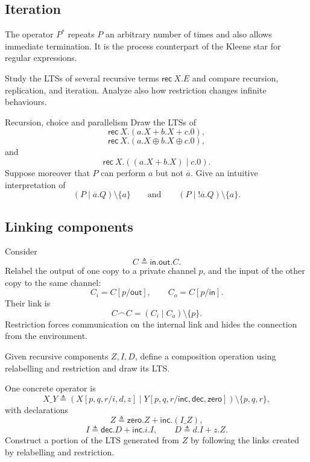 \documentclass[a4paper]{article}
\begin{document}
\subsection{Iteration}

The operator \(P^*\) repeats \(P\) an arbitrary number of times and also allows immediate termination.
It is the process counterpart of the Kleene star for regular expressions.

\begin{snippetexercise}{}
    Study the LTSs of several recursive terms \(\mathsf{rec}\ X.E\) and compare recursion, replication, and iteration.
    Analyze also how restriction changes infinite behaviours.
\end{snippetexercise}

\begin{snippetexercise}{Recursion, choice and parallelism}
    Draw the LTSs of
    \[
        \mathsf{rec}\ X.(a.X+b.X+c.0),
    \]
    \[
        \mathsf{rec}\ X.(a.X\oplus b.X\oplus c.0),
    \]
    and
    \[
        \mathsf{rec}\ X.((a.X+b.X)\mid c.0).
    \]
    Suppose moreover that \(P\) can perform \(a\) but not \(\overline a\). Give an intuitive interpretation of
    \[
        (P\mid\overline a.Q)\setminus\{a\}
        \qquad\text{and}\qquad
        (P\mid!\overline a.Q)\setminus\{a\}.
    \]
\end{snippetexercise}

\subsection{Linking components}

Consider
\[
    C\triangleq\mathsf{in}.\mathsf{out}.C.
\]
Relabel the output of one copy to a private channel \(p\), and the input of the other copy to the same channel:
\[
    C_i=C[p/\mathsf{out}],
    \qquad
    C_o=C[p/\mathsf{in}].
\]
Their link is
\[
    C\mathbin{\frown}C
    =
    (C_i\mid C_o)\setminus\{p\}.
\]
Restriction forces communication on the internal link and hides the connection from the environment.

\begin{snippetexercise}{}
    Given recursive components \(Z,I,D\), define a composition operation using relabelling and restriction and draw its LTS.
\end{snippetexercise}

One concrete operator is
\[
    X\_Y
    \triangleq
    \left(
        X[p,q,r/i,d,z]
        \mid
        Y[p,q,r/\mathsf{inc},\mathsf{dec},\mathsf{zero}]
    \right)\setminus\{p,q,r\},
\]
with declarations
\[
    Z\triangleq \mathsf{zero}.Z+\mathsf{inc}.(I\_Z),
\]
\[
    I\triangleq \mathsf{dec}.D+\mathsf{inc}.i.I,
    \qquad
    D\triangleq d.I+z.Z.
\]
Construct a portion of the LTS generated from \(Z\) by following the links created by relabelling and restriction.
\end{document}
